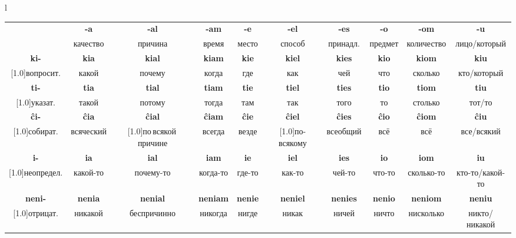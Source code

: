 \documentclass{article}
\def\b#1{\textbf{#1}}
\def\g{\cellcolor{gray!25}}
\begin{document}
\begin{center}
\begin{tabular}{l}
\begin{tabular}{|c|c|c|c|c|c|c|c|c|c|}
\hline
\vspace*{-0.3em}\g & \g\b{-a} & \g\b{-al} & \g\b{-am} & \g\b{-e} & \g\b{-el} & \g\b{-es} & \g\b{-o} & \g\b{-om} & \g\b{-u} \\
\g & \g качество & \g причина & \g время & \g место & \g способ & \g принадл. & \g предмет & \g количество & \g лицо/который \\
\hline
\vspace*{-0.3em}\g\b{ki-} & \b{kia} & \b{kial} & \b{kiam} & \b{kie} & \b{kiel} & \b{kies} & \b{kio} & \b{kiom} & \b{kiu} \\
\g\scalebox{.75}[1.0]{вопросит.} & какой & почему & когда & где & как & чей & что & сколько & кто/который \\
\hline
\vspace*{-0.3em}\g\b{ti-} & \b{tia} & \b{tial} & \b{tiam} & \b{tie} & \b{tiel} & \b{ties} & \b{tio} & \b{tiom} & \b{tiu} \\
\g\scalebox{.75}[1.0]{указат.} & такой & потому & тогда & там & так & того & то & столько & тот/то \\
\hline
\vspace*{-0.3em}\g\b{ĉi-} & \b{ĉia} & \b{ĉial} & \b{ĉiam} & \b{ĉie} & \b{ĉiel} & \b{ĉies} & \b{ĉio} & \b{ĉiom} & \b{ĉiu} \\
\g\scalebox{.75}[1.0]{собират.} & всяческий & \scalebox{.75}[1.0]{по\,всякой\,причине} & всегда & везде & \scalebox{.75}[1.0]{по-всякому} & всеобщий & всё & всё & все/всякий \\
\hline
\vspace*{-0.3em}\g\b{i-} & \b{ia} & \b{ial} & \b{iam} & \b{ie} & \b{iel} & \b{ies} & \b{io} & \b{iom} & \b{iu} \\
\g\scalebox{.75}[1.0]{неопредел.} & какой-то & почему-то & когда-то & где-то & как-то & чей-то & что-то & сколько-то & кто-то/какой-то \\
\hline
\vspace*{-0.3em}\g\b{neni-} & \b{nenia} & \b{nenial} & \b{neniam} & \b{nenie} & \b{neniel} & \b{nenies} & \b{nenio} & \b{neniom} & \b{neniu} \\
\g\scalebox{.75}[1.0]{отрицат.} & никакой & беспричинно & никогда & нигде & никак & ничей & ничто & нисколько & никто/никакой \\
\hline
\end{tabular}
\vspace{0.5em}\\


\end{tabular}
\end{center}
\end{document}
